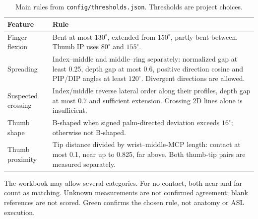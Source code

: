 \begin{table}[h]\centering\small
\caption{Main rules from \texttt{config/thresholds.json}. Thresholds are project choices.}
\begin{tabular}{p{.19\linewidth}p{.72\linewidth}}\toprule
Feature & Rule\\\midrule
Finger flexion & Bent at most $130^\circ$, extended from $150^\circ$, partly bent between. Thumb IP uses $80^\circ$ and $155^\circ$.\\
Spreading & Index--middle and middle--ring separately: normalized gap at least 0.25, depth gap at most 0.6, positive direction cosine and PIP/DIP angles at least $120^\circ$. Divergent directions are allowed.\\
Suspected crossing & Index/middle reverse lateral order along their profiles, depth gap at most 0.7 and sufficient extension. Crossing 2D lines alone is insufficient.\\
Thumb shape & B-shaped when signed palm-directed deviation exceeds $16^\circ$; otherwise not B-shaped.\\
Thumb proximity & Tip distance divided by wrist--middle-MCP length: contact at most 0.1, near up to 0.825, far above. Both thumb-tip pairs are measured separately.\\\bottomrule
\end{tabular}\end{table}

The workbook may allow several categories. For no contact, both near and far count as matching. Unknown measurements are not confirmed agreement; blank references are not scored. Green confirms the chosen rule, not anatomy or ASL execution.
